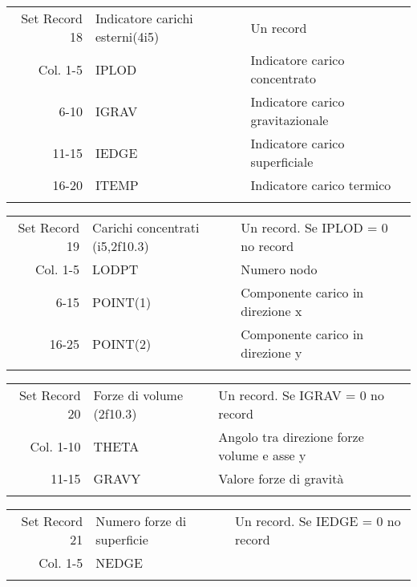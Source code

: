 \begin{tabular}{rll}
	Set Record 18& Indicatore carichi esterni(4i5)& Un record                                         \\
	Col. 1-5     & IPLOD                          & Indicatore carico concentrato                     \\
	6-10     & IGRAV                          & Indicatore carico gravitazionale                  \\
	11-15     & IEDGE                          & Indicatore carico superficiale                    \\
	16-20     & ITEMP                          & Indicatore carico termico                         \\
	&                                &                                                   \\
\end{tabular}

\begin{tabular}{rll}
	Set Record 19& Carichi concentrati (i5,2f10.3)& Un record. Se IPLOD = 0 no record                 \\
	Col. 1-5     & LODPT                          & Numero nodo                                       \\
	6-15     & POINT(1)                       & Componente carico in direzione x                  \\
	16-25     & POINT(2)                       & Componente carico in direzione y                  \\
	&                                &                                                   \\
\end{tabular}

\begin{tabular}{rll}
	Set Record 20& Forze di volume (2f10.3)       & Un record.  Se IGRAV = 0 no record                \\
	Col. 1-10    & THETA                          & Angolo tra direzione forze volume e asse y        \\
	11-15    & GRAVY                          & Valore forze di gravità                           \\
	&                                &                                                   \\
\end{tabular}

\begin{tabular}{rll}
	Set Record 21& Numero forze di superficie     & Un record. Se IEDGE = 0 no record                 \\
	Col.  1-5    & NEDGE                          &  \\	
	&                                &                                                   \\
\end{tabular}

